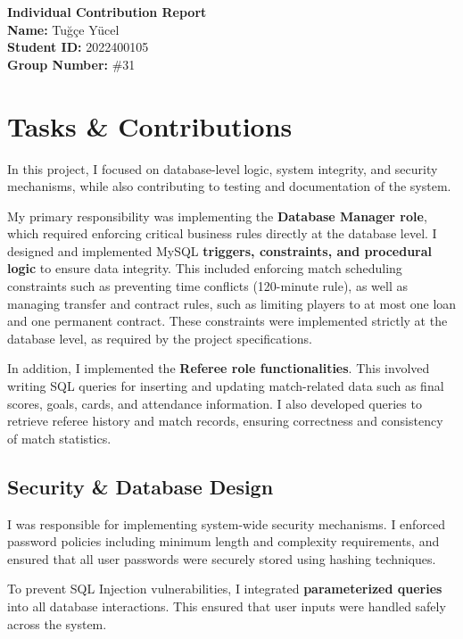\documentclass[12pt, a4paper]{article}
\begin{document}
\begin{center}
    \Large\textbf{Individual Contribution Report} \\
    \vspace{0.5cm}
    \normalsize
    \textbf{Name:} Tuğçe Yücel \\
    \textbf{Student ID:} 2022400105 \\
    \textbf{Group Number:} \#31
\end{center}

\vspace{0.5cm}

\section*{Tasks \& Contributions}

In this project, I focused on database-level logic, system integrity, and security mechanisms, while also contributing to testing and documentation of the system.

My primary responsibility was implementing the \textbf{Database Manager role}, which required enforcing critical business rules directly at the database level. I designed and implemented MySQL \textbf{triggers, constraints, and procedural logic} to ensure data integrity. This included enforcing match scheduling constraints such as preventing time conflicts (120-minute rule), as well as managing transfer and contract rules, such as limiting players to at most one loan and one permanent contract. These constraints were implemented strictly at the database level, as required by the project specifications.

In addition, I implemented the \textbf{Referee role functionalities}. This involved writing SQL queries for inserting and updating match-related data such as final scores, goals, cards, and attendance information. I also developed queries to retrieve referee history and match records, ensuring correctness and consistency of match statistics.

\subsection*{Security \& Database Design}

I was responsible for implementing system-wide security mechanisms. I enforced password policies including minimum length and complexity requirements, and ensured that all user passwords were securely stored using hashing techniques. 

To prevent SQL Injection vulnerabilities, I integrated \textbf{parameterized queries} into all database interactions. This ensured that user inputs were handled safely across the system.
\end{document}
